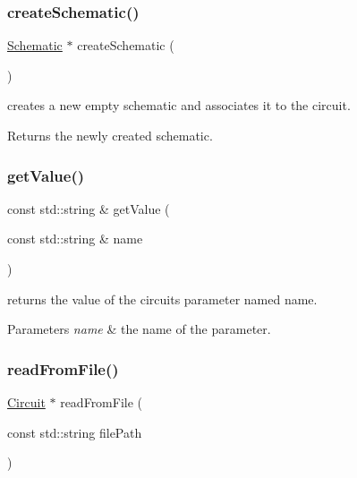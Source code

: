 \subsubsection{\texorpdfstring{create\+Schematic()}{createSchematic()}}
{\footnotesize\ttfamily \hyperlink{class_open_chams_1_1_schematic}{Schematic} $\ast$ create\+Schematic (\begin{DoxyParamCaption}{ }\end{DoxyParamCaption})}



creates a new empty schematic and associates it to the circuit. 

\begin{DoxyReturn}{Returns}
the newly created schematic. 
\end{DoxyReturn}
\mbox{\label{class_open_chams_1_1_circuit_a6650bf10e394fe2d6fa1d50e247da296}} 
\subsubsection{\texorpdfstring{get\+Value()}{getValue()}}
{\footnotesize\ttfamily const std\+::string \& get\+Value (\begin{DoxyParamCaption}\item[{const std\+::string \&}]{name }\end{DoxyParamCaption})\hspace{0.3cm}{\ttfamily [inline]}}



returns the value of the circuit\textquotesingle{}s parameter named {\ttfamily name}. 


\begin{DoxyParams}{Parameters}
{\em name} & the name of the parameter. \\
\hline
\end{DoxyParams}
\mbox{\label{class_open_chams_1_1_circuit_ad0aa3183bdea59e62f69c295026b7fe7}} 
\subsubsection{\texorpdfstring{read\+From\+File()}{readFromFile()}}
{\footnotesize\ttfamily \hyperlink{class_open_chams_1_1_circuit}{Circuit} $\ast$ read\+From\+File (\begin{DoxyParamCaption}\item[{const std\+::string}]{file\+Path }\end{DoxyParamCaption})\hspace{0.3cm}{\ttfamily [static]}}



